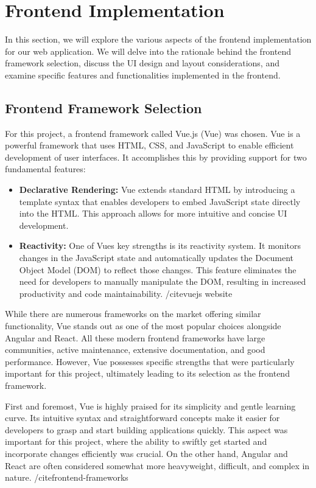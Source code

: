 \documentclass[a4paper,12pt]{report} %
\begin{document}
\section{Frontend Implementation}
In this section, we will explore the various aspects of the frontend implementation for our web application. We will delve into the rationale behind the frontend framework selection, discuss the UI design and layout considerations, and examine specific features and functionalities implemented in the frontend.

\subsection{Frontend Framework Selection}
For this project, a frontend framework called Vue.js (Vue) was chosen. Vue is a powerful framework that uses HTML, CSS, and JavaScript to enable efficient development of user interfaces. It accomplishes this by providing support for two fundamental features:

\begin{itemize}
  \item \textbf{Declarative Rendering:} Vue extends standard HTML by introducing a template syntax that enables developers to embed JavaScript state directly into the HTML. This approach allows for more intuitive and concise UI development.

  \item \textbf{Reactivity:} One of Vues key strengths is its reactivity system. It monitors changes in the JavaScript state and automatically updates the Document Object Model (DOM) to reflect those changes. This feature eliminates the need for developers to manually manipulate the DOM, resulting in increased productivity and code maintainability. /cite{vuejs website}
\end{itemize}

While there are numerous frameworks on the market offering similar functionality, Vue stands out as one of the most popular choices alongside Angular and React. All these modern frontend frameworks have large communities, active maintenance, extensive documentation, and good performance. However, Vue possesses specific strengths that were particularly important for this project, ultimately leading to its selection as the frontend framework.

First and foremost, Vue is highly praised for its simplicity and gentle learning curve. Its intuitive syntax and straightforward concepts make it easier for developers to grasp and start building applications quickly. This aspect was important for this project, where the ability to swiftly get started and incorporate changes efficiently was crucial. On the other hand, Angular and React are often considered somewhat more heavyweight, difficult, and complex in nature. /cite{frontend-frameworks}
\end{document}
